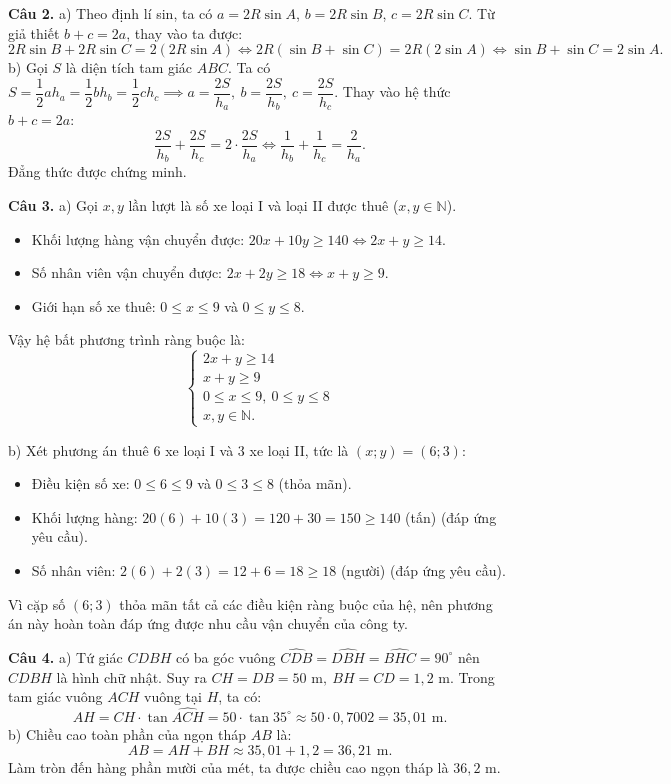 \documentclass[12pt,a4paper]{article}
\begin{document}
\vspace{0.15cm}
\textbf{Câu 2.}
a) Theo định lí sin, ta có $a = 2R\sin A$, $b = 2R\sin B$, $c = 2R\sin C$.
Từ giả thiết $b + c = 2a$, thay vào ta được:
\[
2R\sin B + 2R\sin C = 2(2R\sin A) \iff 2R(\sin B + \sin C) = 2R(2\sin A) \iff \sin B + \sin C = 2\sin A.
\]
b) Gọi $S$ là diện tích tam giác $ABC$. Ta có $S = \dfrac{1}{2}a h_a = \dfrac{1}{2}b h_b = \dfrac{1}{2}c h_c \implies a = \dfrac{2S}{h_a},\ b = \dfrac{2S}{h_b},\ c = \dfrac{2S}{h_c}$.
Thay vào hệ thức $b + c = 2a$:
\[
\dfrac{2S}{h_b} + \dfrac{2S}{h_c} = 2 \cdot \dfrac{2S}{h_a} \iff \dfrac{1}{h_b} + \dfrac{1}{h_c} = \dfrac{2}{h_a}.
\]
Đẳng thức được chứng minh.

\vspace{0.15cm}
\textbf{Câu 3.}
a) Gọi $x, y$ lần lượt là số xe loại I và loại II được thuê ($x, y \in \mathbb{N}$).
\begin{itemize}[leftmargin=0.5cm, itemsep=1pt, topsep=1pt]
    \item Khối lượng hàng vận chuyển được: $20x + 10y \ge 140 \iff 2x + y \ge 14$.
    \item Số nhân viên vận chuyển được: $2x + 2y \ge 18 \iff x + y \ge 9$.
    \item Giới hạn số xe thuê: $0 \le x \le 9$ và $0 \le y \le 8$.
\end{itemize}
Vậy hệ bất phương trình ràng buộc là:
\[
\begin{cases}
2x + y \ge 14 \\
x + y \ge 9 \\
0 \le x \le 9,\ 0 \le y \le 8 \\
x, y \in \mathbb{N}.
\end{cases}
\]

b) Xét phương án thuê $6$ xe loại I và $3$ xe loại II, tức là $(x; y) = (6; 3)$:
\begin{itemize}[leftmargin=0.5cm, itemsep=1pt, topsep=1pt]
    \item Điều kiện số xe: $0 \le 6 \le 9$ và $0 \le 3 \le 8$ (thỏa mãn).
    \item Khối lượng hàng: $20(6) + 10(3) = 120 + 30 = 150 \ge 140$ (tấn) (đáp ứng yêu cầu).
    \item Số nhân viên: $2(6) + 2(3) = 12 + 6 = 18 \ge 18$ (người) (đáp ứng yêu cầu).
\end{itemize}
Vì cặp số $(6; 3)$ thỏa mãn tất cả các điều kiện ràng buộc của hệ, nên phương án này hoàn toàn đáp ứng được nhu cầu vận chuyển của công ty.

\vspace{0.15cm}
\textbf{Câu 4.}
a) Tứ giác $CDBH$ có ba góc vuông $\widehat{CDB} = \widehat{DBH} = \widehat{BHC} = 90^\circ$ nên $CDBH$ là hình chữ nhật.
Suy ra $CH = DB = 50\text{ m},\ BH = CD = 1{,}2\text{ m}$.
Trong tam giác vuông $ACH$ vuông tại $H$, ta có:
\[
AH = CH \cdot \tan \widehat{ACH} = 50 \cdot \tan 35^\circ \approx 50 \cdot 0{,}7002 = 35{,}01\text{ m}.
\]
b) Chiều cao toàn phần của ngọn tháp $AB$ là:
\[
AB = AH + BH \approx 35{,}01 + 1{,}2 = 36{,}21\text{ m}.
\]
Làm tròn đến hàng phần mười của mét, ta được chiều cao ngọn tháp là $36{,}2\text{ m}$.
\end{document}
